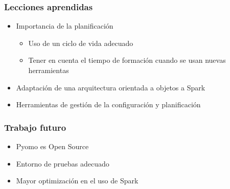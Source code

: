 \documentclass{beamer}
\begin{document}
\begin{frame}{}
    \frametitle{Lecciones aprendidas}
    \begin{itemize}
        \item Importancia de la planificación \pause
        \begin{itemize}
            \item Uso de un ciclo de vida adecuado
            \item Tener en cuenta el tiempo de formación cuando se usan nuevas herramientas \pause
        \end{itemize}
        \item Adaptación de una arquitectura orientada a objetos a Spark \pause
        \item Herramientas de gestión de la configuración y planificación \pause
    \end{itemize}
\end{frame}

\begin{frame}{}
    \frametitle{Trabajo futuro}
    \begin{itemize}
        \item Pyomo es Open Source \pause
        \item Entorno de pruebas adecuado
        \item Mayor optimización en el uso de Spark
    \end{itemize}
\end{frame}

\begin{frame}[plain]
    \titlepage
\end{frame}
\end{document}
